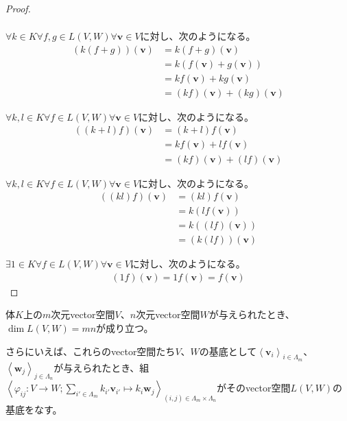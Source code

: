 \documentclass[dvipdfmx]{jsarticle}
\begin{document}
\begin{proof}
\begin{align*}
\end{align*}\par
$\forall k \in K\forall f,g \in L(V,W)\forall\mathbf{v} \in V$に対し、次のようになる。
\begin{align*}
\left( k(f + g) \right)\left( \mathbf{v} \right) &= k(f + g)\left( \mathbf{v} \right)\\
&= k\left( f\left( \mathbf{v} \right) + g\left( \mathbf{v} \right) \right)\\
&= kf\left( \mathbf{v} \right) + kg\left( \mathbf{v} \right)\\
&= (kf)\left( \mathbf{v} \right) + (kg)\left( \mathbf{v} \right)
\end{align*}\par
$\forall k,l \in K\forall f \in L(V,W)\forall\mathbf{v} \in V$に対し、次のようになる。
\begin{align*}
\left( (k + l)f \right)\left( \mathbf{v} \right) &= (k + l)f\left( \mathbf{v} \right)\\
&= kf\left( \mathbf{v} \right) + lf\left( \mathbf{v} \right)\\
&= (kf)\left( \mathbf{v} \right) + (lf)\left( \mathbf{v} \right)
\end{align*}\par
$\forall k,l \in K\forall f \in L(V,W)\forall\mathbf{v} \in V$に対し、次のようになる。
\begin{align*}
\left( (kl)f \right)\left( \mathbf{v} \right) &= (kl)f\left( \mathbf{v} \right)\\
&= k\left( lf\left( \mathbf{v} \right) \right)\\
&= k\left( (lf)\left( \mathbf{v} \right) \right)\\
&= \left( k(lf) \right)\left( \mathbf{v} \right)
\end{align*}\par
$\exists 1 \in K\forall f \in L(V,W)\forall\mathbf{v} \in V$に対し、次のようになる。
\begin{align*}
(1f)\left( \mathbf{v} \right) = 1f\left( \mathbf{v} \right) = f\left( \mathbf{v} \right)
\end{align*}
\end{proof}
\begin{thm}\label{2.1.2.9}
体$K$上の$m$次元vector空間$V$、$n$次元vector空間$W$が与えられたとき、$\dim{L(V,W)} = mn$が成り立つ。\par
さらにいえば、これらのvector空間たち$V$、$W$の基底として$\left\langle \mathbf{v}_{i} \right\rangle_{i \in \varLambda_{m}}$、$\left\langle \mathbf{w}_{j} \right\rangle_{j \in \varLambda_{n}}$が与えられたとき、組$\left\langle \varphi_{ij}:V \rightarrow W;\sum_{i' \in \varLambda_{m}} {k_{i'}\mathbf{v}_{i'}} \mapsto k_{i}\mathbf{w}_{j} \right\rangle_{(i,j) \in \varLambda_{m} \times \varLambda_{n}}$がそのvector空間$L(V,W)$の基底をなす。
\end{thm}
\end{document}
